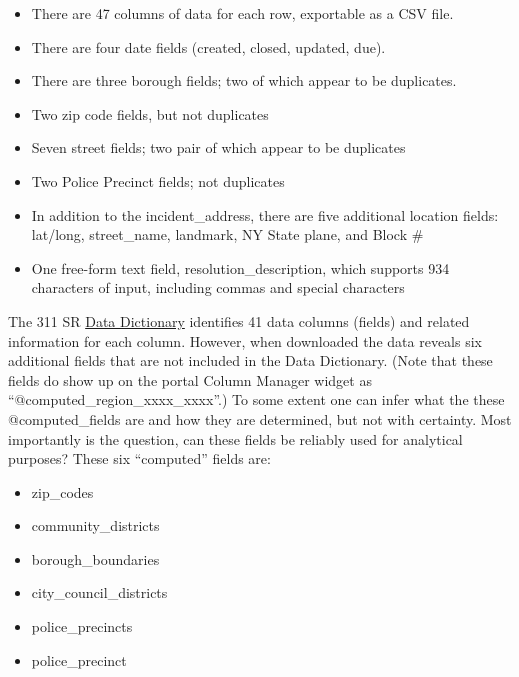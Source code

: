 \documentclass[linenumber]{jdsart}
\begin{document}
\begin{itemize}
	\item There are 47 columns of data for each row, exportable as a CSV file.
	
	\item There are four date fields (created, closed, updated, due).
	
	\item There are three borough fields; two of which appear to be duplicates.
	
	\item Two zip code fields, but not duplicates
	
	\item Seven street fields; two pair of which appear to be duplicates
	
	\item Two Police Precinct fields; not duplicates
	
	\item In addition to the incident\_address, there are five additional location fields: 
	lat/long, street\_name, landmark, NY State plane, and Block \#
	
	\item One free-form text field, resolution\_description, which 
	supports 934 characters of input, including commas and special characters
\end{itemize}

The 311 SR \href{https://data.cityofnewyork.us/api/views/erm2-nwe9/files/b372b884-f86a-453b-ba16-1fe06ce9d212?download=true&filename=311_ServiceRequest_2010-Present_DataDictionary_Updated_2023.xlsx}{Data Dictionary}
 identifies 41 data columns (fields) and related information 
 for each column. However, when downloaded the data reveals 
 six additional fields that are not included in the Data Dictionary. 
(Note that these fields do show up on the portal Column Manager widget
 as ``@computed\_region\_xxxx\_xxxx''.) To some extent one can infer 
 what the these @computed\_fields are and how they are determined, but
 not with certainty. Most importantly is the question, can these fields be reliably 
 used for analytical purposes?  These six ``computed'' fields are:

\begin{itemize}
	\item zip\_codes
	
	\item community\_districts
	
	\item borough\_boundaries
	
	\item city\_council\_districts
	
	\item police\_precincts
	
	\item police\_precinct 
\end{itemize}	
\end{document}
